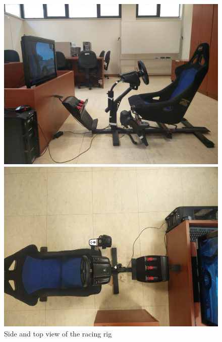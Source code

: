 \begin{figure}
	\centering
	\begin{minipage}{0.45\textwidth}
		\centering
		\includegraphics[width=\textwidth]{images/RacingRig}
	\end{minipage}\hfill
	\begin{minipage}{0.45\textwidth}
		\centering
		\includegraphics[width=\textwidth]{images/RacingRig2}
	\end{minipage}
	\caption[Side and top view of the racing rig]{Side and top view of the racing rig}
	\label{sec:eval-simRacingRig}
\end{figure}

